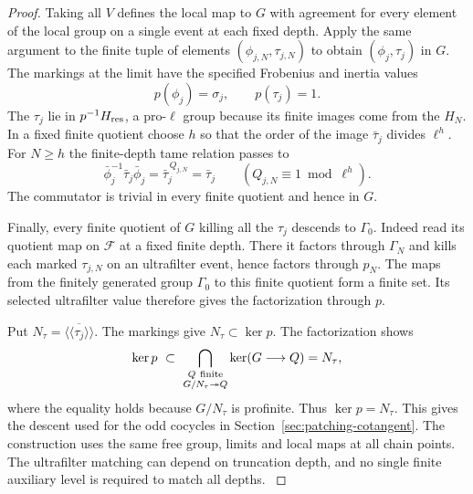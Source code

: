 \begin{proof}
Taking all \(V\) defines the local map to \(G\)
with agreement for every element of the local group on a
single event at each fixed depth. Apply the same argument to
the finite tuple of elements \((\phi_{j,N},\tau_{j,N})\)
to obtain \((\phi_j,\tau_j)\) in \(G\). The markings at the limit have the specified Frobenius and inertia values
\[
 p(\phi_j)=\sigma_j,\qquad p(\tau_j)=1 .
\] The \(\tau_j\) lie in \(p^{-1}H_{\rm res}\), a
pro-\(\ell\) group because its finite images come from the
\(H_N\). In a fixed finite quotient choose \(h\) so that the order of the image \(\bar\tau_j\) divides \(\ell^h\). For \(N\ge h\) the finite-depth tame relation
passes to
\[
 \bar\phi_j^{-1}\bar\tau_j\bar\phi_j
 =\bar\tau_j^{\,Q_{j,N}}=\bar\tau_j
 \qquad (Q_{j,N}\equiv1\bmod\ell^h).
\]
The commutator is trivial in every finite quotient and hence in \(G\).

Finally, every finite quotient of \(G\) killing all the
\(\tau_j\) descends to \(\Gamma_0\). Indeed read its quotient
map on \(\mathcal F\) at a fixed finite depth. There it factors
through \(\Gamma_N\) and kills each marked \(\tau_{j,N}\)
on an ultrafilter event, hence factors through \(p_N\).
The maps from the finitely generated group \(\Gamma_0\)
to this finite quotient form a finite set. Its selected
ultrafilter value therefore gives the factorization through
\(p\).

Put \(N_\tau=\overline{\langle\!\langle\tau_j
\rangle\!\rangle}\). The markings give \(N_\tau\subset\ker p\).
The factorization shows
\[
 \ker p\ \subset\
       \bigcap_{\substack{Q\ {\rm finite}\\G/N_\tau\twoheadrightarrow Q}}
       \ker(G\longrightarrow Q)=N_\tau ,
\]
where the equality holds because \(G/N_\tau\) is profinite.
Thus \(\ker p=N_\tau\). This gives the descent used for
the odd cocycles in Section~\ref{sec:patching-cotangent}.
The construction uses the same free group, limits and local
maps at all chain points. The ultrafilter matching can depend
on truncation depth, and no single finite auxiliary level is
required to match all depths.
\label{cor:ordinary-patching-marking-2}
\end{proof}
